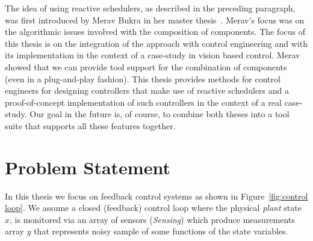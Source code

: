 \documentclass[ twoside, 12pt ]{article}
\begin{document}
The idea of using reactive schedulers, as described in the preceding paragraph, was first introduced by Merav Bukra in her master thesis~\cite{Merav}. Merav's focus was on the algorithmic issues involved with the composition of components. The focus of this thesis is on the integration of the approach with control engineering and with its implementation in the context of a case-study in vision based control. Merav showed that we can provide tool support for the combination of components (even in a plug-and-play fashion). This thesis provides methods for control engineers for designing controllers that make use of reactive schedulers and a proof-of-concept implementation of such controllers in the context of a real case-study. Our goal in the future is, of course, to combine both theses into a tool suite that supports all these features together.

 
\section{Problem Statement}
\label{sec:Problem}
In this thesis we focus on feedback control systems as shown in Figure~\ref{fig:control loop}. We assume a closed (feedback) control loop where the physical \textit{plant} state $x$, is monitored via an array of sensors (\textit{Sensing}) which produce measurements array $y$ that represents noisy sample of some functions of the state variables.
\end{document}
